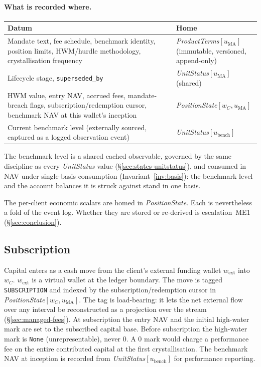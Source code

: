 \paragraph{What is recorded where.}

\begin{longtable}{p{8.0cm}p{6.4cm}}
\toprule
\textbf{Datum} & \textbf{Home} \\
\midrule
Mandate text, fee schedule, benchmark identity, position limits, HWM/hurdle methodology,
crystallisation frequency & \textit{ProductTerms}$[u_{\mathrm{MA}}]$ (immutable, versioned,
append-only) \\
Lifecycle stage, \texttt{superseded\_by} & \textit{UnitStatus}$[u_{\mathrm{MA}}]$ (shared) \\
HWM value, entry NAV, accrued fees, mandate-breach flags, subscription/redemption cursor,
benchmark NAV at this wallet's inception & \textit{PositionState}$[w_C,u_{\mathrm{MA}}]$ \\
Current benchmark level (externally sourced, captured as a logged observation event) &
\textit{UnitStatus}$[u_{\mathrm{bench}}]$ \\
\bottomrule
\end{longtable}

The benchmark level is a shared cached observable, governed by the same discipline as every
\textit{UnitStatus} value (\S\ref{sec:states-unitstatus}), and consumed in NAV under
single-basis consumption (Invariant~\ref{inv:basis}): the benchmark level and the account
balances it is struck against stand in one basis.

The per-client economic scalars are homed in \textit{PositionState}. Each is nevertheless a
fold of the event log. Whether they are stored or re-derived is escalation~ME1
(\S\ref{sec:conclusion}).

\subsection{Subscription}
\label{sec:managed-subscription}

Capital enters as a cash move from the client's external funding wallet $w_{\text{ext}}$
into $w_C$. $w_{\text{ext}}$ is a virtual wallet at the ledger boundary. The move is tagged
\texttt{SUBSCRIPTION} and indexed by the subscription/redemption cursor in
\textit{PositionState}$[w_C,u_{\mathrm{MA}}]$. The tag is load-bearing: it lets the net
external flow over any interval be reconstructed as a projection over the stream
(\S\ref{sec:managed-fees}). At subscription the entry NAV and the initial high-water mark
are set to the subscribed capital base. Before subscription the high-water mark is
\texttt{None} (unrepresentable), never $0$. A $0$ mark would charge a performance fee on the
entire contributed capital at the first crystallisation. The benchmark NAV at inception is
recorded from \textit{UnitStatus}$[u_{\mathrm{bench}}]$ for performance reporting.

